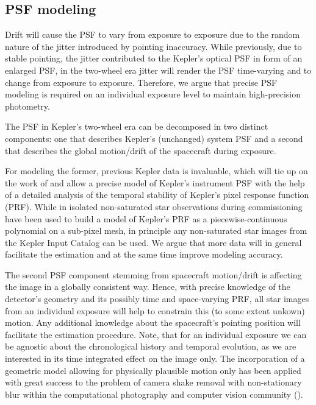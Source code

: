 \documentclass[letterpaper,12pt,whitepaper]{haastex}
\begin{document}
\subsection{PSF modeling}\label{sec:psf}

Drift will cause the PSF to vary from exposure to exposure due to the
random nature of the jitter introduced by pointing inaccuracy. While
previously, due to stable pointing, the jitter contributed to the
Kepler's optical PSF in form of an enlarged PSF, in the two-wheel era
jitter will render the PSF time-varying and to change from exposure to
exposure. Therefore, we argue that precise PSF modeling is required on
an individual exposure level to maintain high-precision photometry.

The PSF in Kepler's two-wheel era can be decomposed in two distinct
components: one that describes Kepler's (unchanged) system PSF and a
second that describes the global motion/drift of the spacecraft during
exposure.

For modeling the former, previous Kepler data is invaluable, which
will tie up on the work of \cite{bryson2010} and allow a precise model
of Kepler's instrument PSF with the help of a detailed analysis of the
temporal stability of Kepler's pixel response function (PRF). While in
\cite{bryson2010} isolated non-saturated star observations during
commissioning have been used to build a model of Kepler's PRF as a
piecewise-continuous polynomial on a sub-pixel mesh, in principle any
non-saturated star images from the Kepler Input Catalog can be
used. We argue that more data will in general facilitate the
estimation and at the same time improve modeling accuracy.

The second PSF component stemming from spacecraft motion/drift is
affecting the image in a globally consistent way. Hence, with precise
knowledge of the detector's geometry and its possibly time and
space-varying PRF, all star images from an individual exposure will
help to constrain this (to some extent unkown) motion. Any additional
knowledge about the spacecraft's pointing position will facilitate the
estimation procedure. Note, that for an individual exposure we can be
agnostic about the chronological history and temporal evolution, as we
are interested in its time integrated effect on the image only. The
incorporation of a geometric model allowing for physically plausible
motion only has been applied with great success to the problem of
camera shake removal with non-stationary blur within the computational
photography and computer vision community
(\citealt{fergus2006,whyte2010,hirsch2011,koehler2012}).
\end{document}
